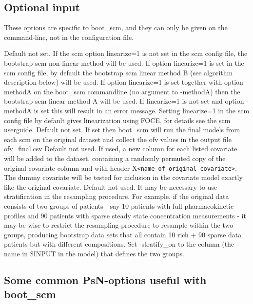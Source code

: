 \subsection{Optional input}
These options are specific to boot\_scm, and they can only be given on the command-line, not in the configuration file.
\begin{optionlist}
Default not set. If the scm option linearize=1 is not set in the scm config file, 
the bootstrap scm non-linear method will be used. If option linearize=1 is set in the scm config file, 
by default the bootstrap scm linear method B (see algorithm description below) will be used. 
If option linearize=1 is set  together with option -methodA on the boot\_scm commandline (no argument to -methodA) 
then the bootstrap scm linear method A will be used. If linearize=1 
is not set and option -methodA is set this will result in an error message.  
Setting linearize=1 in the scm config file by default gives linearization using FOCE, for details see the
scm userguide.
\nextopt
{}
Default not set. If set then boot\_scm will run the final models from each scm on the original dataset and collect the ofv values 
in the output file ofv\_final.csv   
\nextopt
{}
Default not used. If used, a new column for each listed covariate will be added to the dataset, 
containing a randomly permuted copy of the original covariate column and with header X\verb|<name of original covariate>|. 
The dummy covariate will be tested for inclusion in the covariate model exactly like the original covariate. 
\nextopt
{}
Default not used. It may be necessary to use stratification in the resampling procedure. For example, if the original data consists of two groups of patients - say 10 patients with full pharmacokinetic profiles and 90 patients with sparse steady state concentration measurements - it may be wise to restrict the resampling procedure to resample within the two groups, producing bootstrap data sets that all contain 10 rich + 90 sparse data patients but with different compositions. 
Set -stratify\_on to the column (the name in \$INPUT in the model) that defines the two groups.
\nextopt
\end{optionlist}


\subsection{Some common PsN-options useful with boot\_scm}

